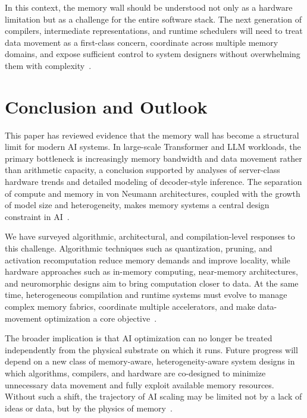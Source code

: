 \documentclass[conference]{IEEEtran}
\begin{document}
In this context, the memory wall should be understood not only as a hardware limitation but as a challenge for the entire software stack. The next generation of compilers, intermediate representations, and runtime schedulers will need to treat data movement as a first-class concern, coordinate across multiple memory domains, and expose sufficient control to system designers without overwhelming them with complexity~\cite{gholami2024ai,heterogeneous2021,memorycompilers2026}.

\section{Conclusion and Outlook}
\label{sec:conclusion}

This paper has reviewed evidence that the memory wall has become a structural limit for modern AI systems. In large-scale Transformer and LLM workloads, the primary bottleneck is increasingly memory bandwidth and data movement rather than arithmetic capacity, a conclusion supported by analyses of server-class hardware trends and detailed modeling of decoder-style inference. The separation of compute and memory in von Neumann architectures, coupled with the growth of model size and heterogeneity, makes memory systems a central design constraint in AI~\cite{gholami2024ai,roy2025breaking}.

We have surveyed algorithmic, architectural, and compilation-level responses to this challenge. Algorithmic techniques such as quantization, pruning, and activation recomputation reduce memory demands and improve locality, while hardware approaches such as in-memory computing, near-memory architectures, and neuromorphic designs aim to bring computation closer to data. At the same time, heterogeneous compilation and runtime systems must evolve to manage complex memory fabrics, coordinate multiple accelerators, and make data-movement optimization a core objective~\cite{bavikadi2020review,roy2025breaking,sunrise2020,heterogeneous2021,memorycompilers2026}.

The broader implication is that AI optimization can no longer be treated independently from the physical substrate on which it runs. Future progress will depend on a new class of memory-aware, heterogeneity-aware system designs in which algorithms, compilers, and hardware are co-designed to minimize unnecessary data movement and fully exploit available memory resources. Without such a shift, the trajectory of AI scaling may be limited not by a lack of ideas or data, but by the physics of memory~\cite{gholami2024ai,roy2025breaking,sunrise2020}.
\end{document}
